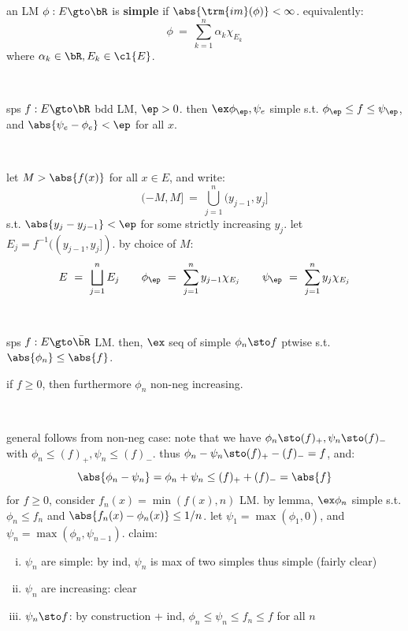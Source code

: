 \begin{defn}
	an LM $\phi:E\gto\bR$ is \textbf{simple} if $\abs{\trm{im}(\phi)}<\infty$.
	equivalently:
	\begin{equation*}
		\phi \ = \ \sum_{k=1}^{n}\alpha_{k}\chi_{E_{k}}
	\end{equation*}
	where $\alpha_{k}\in\bR,E_{k}\in\cl{E}$.
\end{defn} \

\begin{lm}
	sps $f:E\gto\bR$ bdd LM, $\ep>0$.
	then $\ex\phi_{\ep},\psi_{e}$ simple s.t. $\phi_{\ep}\leq f\leq\psi_{\ep}$,
	and $\abs{\psi_{e}-\phi_{e}}<\ep$ for all $x$.
\end{lm} \

\begin{pf}
	let $M>\abs{f(x)}$ for all $x\in E$, and write:
	\begin{equation*}
		(-M,M] \ = \ \bigcup_{j=1}^{n}(y_{j-1},y_{j}]
	\end{equation*}
	s.t. $\abs{y_{j}-y_{j-1}}<\ep$ for some strictly increasing $y_{j}$.
	let $E_{j}=f^{-1}((y_{j-1},y_{j}])$.
	by choice of $M$:
	\begin{equation*}
		E \ = \ \bigsqcup_{j=1}^{n}E_{j} \qquad
		\phi_{\ep} \ = \ \sum_{j=1}^{n}y_{j-1}\chi_{E_{j}} \qquad
		\psi_{\ep} \ = \ \sum_{j=1}^{n}y_{j}\chi_{E_{j}}
	\end{equation*}
\end{pf} \

\begin{lm}
	sps $f:E\gto\bar{\bR}$ LM.
	then, $\ex$ seq of simple $\phi_{n}\sto f$ ptwise s.t. $\abs{\phi_{n}}\leq\abs{f}$.

	if $f\geq0$, then furthermore $\phi_{n}$ non-neg increasing.
\end{lm} \

\begin{pf}
	general follows from non-neg case:
	note that we have $\phi_{n}\sto(f)_{+},\psi_{n}\sto(f)_{-}$ with
	$\phi_{n}\leq(f)_{+},\psi_{n}\leq(f)_{-}$.
	thus $\phi_{n}-\psi_{n}\sto(f)_{+}-(f)_{-}=f$, and:
	\begin{equation*}
		\abs{\phi_{n}-\psi_{n}}=\phi_{n}+\psi_{n}\leq(f)_{+}+(f)_{-}=\abs{f}
	\end{equation*}
	for $f\geq0$, consider $f_{n}(x)=\min(f(x),n)$ LM.
	by lemma, $\ex\phi_{n}$ simple s.t. $\phi_{n}\leq f_{n}$ and $\abs{f_{n}(x)-\phi_{n}(x)}\leq1/n$.
	let $\psi_{1}=\max(\phi_{1},0)$, and $\psi_{n}=\max(\phi_{n},\psi_{n-1})$.
	claim:
	\begin{enumerate}[i)]
		\item $\psi_{n}$ are simple:
			by ind, $\psi_{n}$ is max of two simples thus simple
			(fairly clear)
		\item $\psi_{n}$ are increasing: clear
		\item $\psi_{n}\sto f$:
			by construction + ind, $\phi_{n}\leq\psi_{n}\leq f_{n}\leq f$ for all $n$
	\end{enumerate}
\end{pf}
